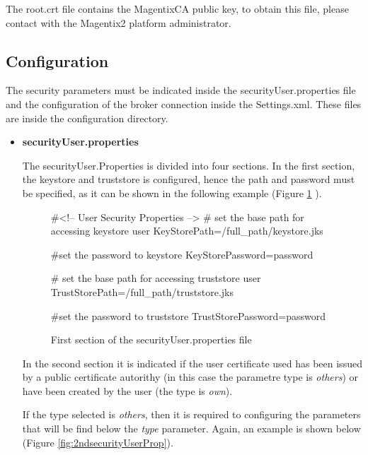 The root.crt file contains the MagentixCA public key, to obtain this file, please contact with the Magentix2 platform administrator.



\subsection{Configuration}
\label{sec:configuration}

The security parameters must be indicated inside the securityUser.properties file and the configuration of the broker connection inside the Settings.xml. These files are inside the configuration directory.

\begin{itemize}
 \item \textbf{securityUser.properties}

 


The securityUser.Properties is divided into four sections. In the first section, the keystore and truststore is configured, hence the path and password must be specified, as it can be shown in the following example (Figure \ref{fig:1stsecurityUserProp} ).

\begin{figure}[h]
\begin{codigo}
    #<!-- User Security Properties -->
    # set the base path for accessing keystore user
    KeyStorePath=/full_path/keystore.jks

    #set the password to keystore
    KeyStorePassword=password

    # set the base path for accessing truststore user
    TrustStorePath=/full_path/truststore.jks

    #set the password to truststore
    TrustStorePassword=password
\end{codigo}

\caption{First section of the securityUser.properties file }
\label{fig:1stsecurityUserProp}
\end{figure}

In the second section it is indicated if the user certificate used has been issued by a public certificate autorithy (in this case the parametre type is \textit{others}) or have been created by the user (the type is \textit{own}).

If the type selected is \textit{others}, then it is required to configuring the parameters that will be find below the \textit{type} parameter. Again, an example is shown below (Figure \ref{fig:2ndsecurityUserProp}).


\end{itemize}

